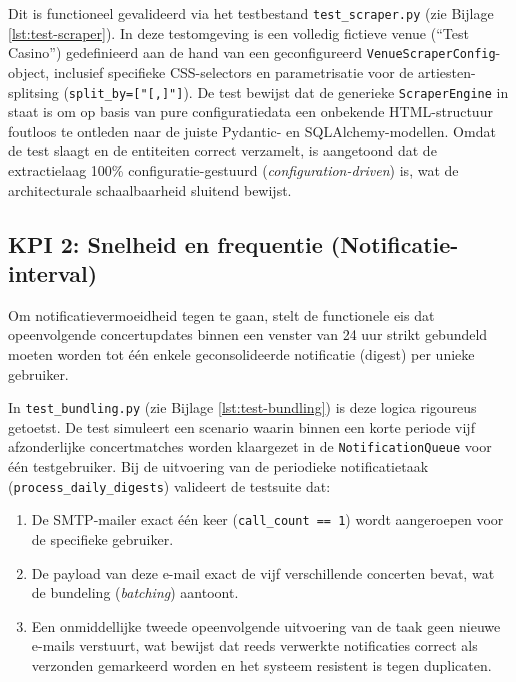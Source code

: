 Dit is functioneel gevalideerd via het testbestand 
\texttt{test\_scraper.py} (zie Bijlage \ref{lst:test-scraper}). 
In deze testomgeving is een volledig fictieve venue (``Test Casino'') 
gedefinieerd aan de hand van een geconfigureerd 
\texttt{VenueScraperConfig}-object, inclusief specifieke CSS-selectors 
en parametrisatie voor de artiesten-splitsing (\texttt{split\_by=["[,]"]}). 
De test bewijst dat de generieke \texttt{ScraperEngine} in staat is om 
op basis van pure configuratiedata een onbekende HTML-structuur 
foutloos te ontleden naar de juiste Pydantic- en SQLAlchemy-modellen. 
Omdat de test slaagt en de entiteiten correct verzamelt, is aangetoond 
dat de extractielaag 100\% configuratie-gestuurd 
(\textit{configuration-driven}) is, wat de architecturale 
schaalbaarheid sluitend bewijst.

\subsection{KPI 2: Snelheid en frequentie (Notificatie-interval)}
Om notificatievermoeidheid tegen te gaan, stelt de functionele eis 
dat opeenvolgende concertupdates binnen een venster van 24 uur 
strikt gebundeld moeten worden tot één enkele geconsolideerde 
notificatie (digest) per unieke gebruiker. 

In \texttt{test\_bundling.py} (zie Bijlage \ref{lst:test-bundling}) 
is deze logica rigoureus getoetst. De test simuleert een scenario 
waarin binnen een korte periode vijf afzonderlijke concertmatches 
worden klaargezet in de \texttt{NotificationQueue} voor één testgebruiker. 
Bij de uitvoering van de periodieke notificatietaak 
(\texttt{process\_daily\_digests}) valideert de testsuite dat:
\begin{enumerate}
    \item De SMTP-mailer exact één keer (\texttt{call\_count == 1}) 
    wordt aangeroepen voor de specifieke gebruiker.
    
    \item De payload van deze e-mail exact de vijf verschillende 
    concerten bevat, wat de bundeling (\textit{batching}) aantoont.
    
    \item Een onmiddellijke tweede opeenvolgende uitvoering van de 
    taak geen nieuwe e-mails verstuurt, wat bewijst dat reeds 
    verwerkte notificaties correct als verzonden gemarkeerd worden 
    en het systeem resistent is tegen duplicaten.
\end{enumerate}

